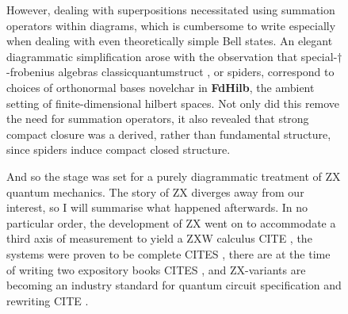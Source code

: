 \begin{figure}[h!]
\centering
{}
\caption{However, dealing with superpositions necessitated using summation operators within diagrams, which is cumbersome to write especially when dealing with even theoretically simple Bell states. An elegant diagrammatic simplification arose with the observation that special-$\dagger$-frobenius algebras \bR classicquantumstruct \e, or spiders, correspond to choices of orthonormal bases \bR novelchar \e in \textbf{FdHilb}, the ambient setting of finite-dimensional hilbert spaces. Not only did this remove the need for summation operators, it also revealed that strong compact closure was a derived, rather than fundamental structure, since spiders induce compact closed structure.}
\end{figure}

\begin{figure}[h!]
\centering
{}
\caption{And so the stage was set for a purely diagrammatic treatment of ZX quantum mechanics. The story of ZX diverges away from our interest, so I will summarise what happened afterwards. In no particular order, the development of ZX went on to accommodate a third axis of measurement to yield a ZXW calculus \bR CITE \e, the systems were proven to be complete \bR CITES \e, there are at the time of writing two expository books \bR CITES \e, and ZX-variants are becoming an industry standard for quantum circuit specification and rewriting \bR CITE \e.}
\end{figure}
\clearpage

